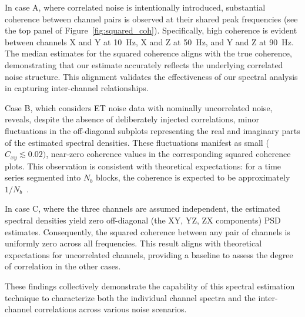 \documentclass[%
 reprint,
 amsmath,amssymb,
 aps,
 nofootinbib,
]{revtex4-2}
\begin{document}
In case A, where correlated noise is intentionally introduced, substantial coherence between channel pairs is observed at their shared peak frequencies (see the top panel of Figure~\ref{fig:squared_coh}). 
Specifically, high coherence is evident between channels X and Y at \SI{10}{Hz}, X and Z at \SI{50}{Hz}, and Y and Z at \SI{90}{Hz}. 
The median estimates for the squared coherence aligns with the true coherence, demonstrating that our estimate accurately reflects the underlying correlated noise structure. This alignment validates the effectiveness of our spectral analysis in capturing inter-channel relationships.

Case B, which considers ET noise data with nominally uncorrelated noise, reveals, despite the absence of deliberately injected correlations, minor fluctuations in the off-diagonal subplots representing the real and imaginary parts of the estimated spectral densities.
These fluctuations manifest as small ($C_{xy}\lesssim0.02)$, near-zero coherence values in the corresponding squared coherence plots. 
This observation is consistent with theoretical expectations: for a time series segmented into $N_b$ blocks, the coherence is expected to be approximately $1/N_b$~\citeme. 

In case C, where the three channels are assumed independent, the estimated spectral densities yield zero off-diagonal (the XY, YZ, ZX components) PSD estimates. 
Consequently, the squared coherence between any pair of channels is uniformly zero across all frequencies. 
This result aligns with theoretical expectations for uncorrelated channels,  providing a baseline to assess the degree of correlation in the other cases.


These findings collectively demonstrate the capability of this spectral estimation technique to characterize both the individual channel spectra and the inter-channel correlations across various noise scenarios. 
\end{document}
